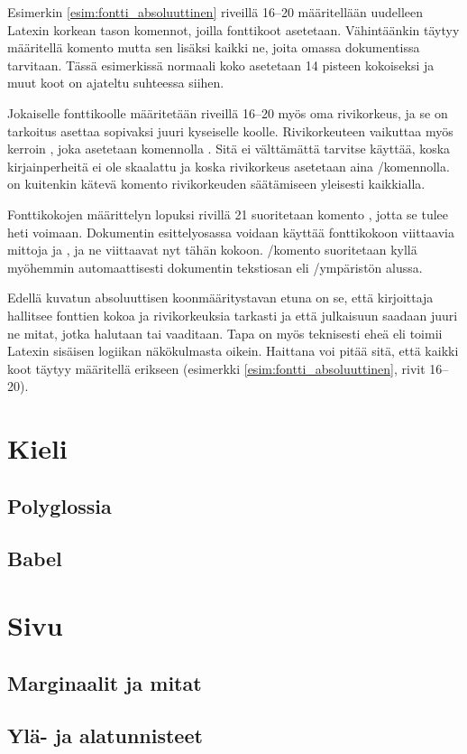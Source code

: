 \begin{koodilohkosis}
  \sffamilyabs\fontsize{16pt}{18pt}\bfseries
\end{koodilohkosis}

Esimerkin \ref{esim:fontti_absoluuttinen} riveillä 16--20 määritellään
uudelleen Latexin korkean tason komennot, joilla fonttikoot asetetaan.
Vähintäänkin täytyy määritellä komento  mutta
sen lisäksi kaikki ne, joita omassa dokumentissa tarvitaan. Tässä
esimerkissä normaali koko asetetaan 14 pisteen kokoiseksi ja muut koot
on ajateltu suhteessa siihen.

Jokaiselle fonttikoolle määritetään riveillä 16--20 myös oma
rivikorkeus, ja se on tarkoitus asettaa sopivaksi juuri kyseiselle
koolle. Rivikorkeuteen vaikuttaa myös kerroin , joka asetetaan komennolla .
Sitä ei välttämättä tarvitse käyttää, koska kirjainperheitä ei ole
skaalattu ja koska rivikorkeus asetetaan aina \-/komennolla.  on kuitenkin kätevä
komento rivikorkeuden säätämiseen yleisesti kaikkialla.

Fonttikokojen määrittelyn lopuksi rivillä 21 suoritetaan komento
, jotta se tulee heti voimaan. Dokumentin
esittely\-osassa voidaan käyttää fonttikokoon viittaavia mittoja
 ja , ja ne viittaavat nyt tähän kokoon.
\-/komento suoritetaan kyllä myöhemmin
automaattisesti dokumentin teksti\-osan eli
\-/ympäristön alussa.

Edellä kuvatun absoluuttisen koonmääritystavan etuna on se, että
kirjoittaja hallitsee fonttien kokoa ja rivikorkeuksia tarkasti ja että
julkaisuun saadaan juuri ne mitat, jotka halutaan tai vaaditaan. Tapa on
myös teknisesti eheä eli toimii Latexin sisäisen logiikan näkökulmasta
oikein. Haittana voi pitää sitä, että kaikki koot täytyy määritellä
erikseen (esimerkki \ref{esim:fontti_absoluuttinen}, rivit 16--20).

\section{Kieli}
\label{luku:kieliasetukset}

\subsection{Polyglossia}
\subsection{Babel}

\section{Sivu}
\label{luku:sivuasetukset}
\subsection{Marginaalit ja mitat}
\subsection{Ylä- ja alatunnisteet}

